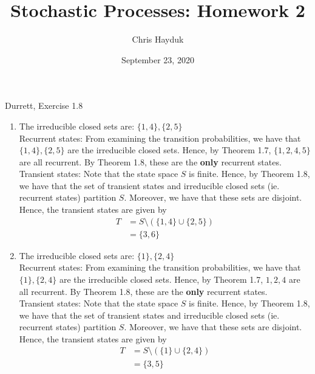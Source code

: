 \documentclass[12pt]{article}
\newenvironment{problem}[2][Problem]{\begin{trivlist}
\item[\hskip \labelsep {\bfseries #1}\hskip \labelsep {\bfseries #2.}]}{\end{trivlist}}
\begin{document}
\title{Stochastic Processes: Homework 2}

\author{Chris Hayduk}
\date{September 23, 2020}

\maketitle

\begin{problem}{1}
Durrett, Exercise 1.8
\end{problem}

\begin{enumerate}[label=(\alph*), start=4]
\item The irreducible closed sets are: $\{1, 4\}, \{2, 5\}$\\

Recurrent states: From examining the transition probabilities, we have that $\{1, 4\}, \{2, 5\}$ are the irreducible closed sets. Hence, by Theorem 1.7, $\{1, 2, 4, 5\}$ are all recurrent. By Theorem 1.8, these are the \textbf{only} recurrent states.\\

Transient states: Note that the state space $S$ is finite. Hence, by Theorem 1.8, we have that the set of transient states and irreducible closed sets (ie. recurrent states) partition $S$. Moreover, we have that these sets are disjoint. Hence, the transient states are given by
\begin{align*}
T &= S \setminus (\{1, 4\} \cup \{2, 5\})\\
&= \{3, 6\}
\end{align*}

\item The irreducible closed sets are: $\{1\}, \{2, 4\}$\\

Recurrent states: From examining the transition probabilities, we have that $\{1\}, \{2, 4\}$ are the irreducible closed sets. Hence, by Theorem 1.7, $1, 2, 4$ are all recurrent. By Theorem 1.8, these are the \textbf{only} recurrent states.\\

Transient states: Note that the state space $S$ is finite. Hence, by Theorem 1.8, we have that the set of transient states and irreducible closed sets (ie. recurrent states) partition $S$. Moreover, we have that these sets are disjoint. Hence, the transient states are given by
\begin{align*}
T &= S \setminus (\{1\} \cup \{2, 4\})\\
&= \{3, 5\}
\end{align*}
\end{enumerate}
\end{document}
